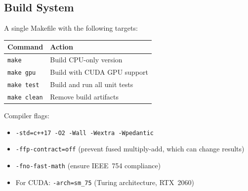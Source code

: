 \subsection{Build System}
\label{sec:build}

A single Makefile with the following targets:

\begin{center}
\begin{tabular}{@{}ll@{}}
\toprule
\textbf{Command} & \textbf{Action} \\
\midrule
\texttt{make}       & Build CPU-only version \\
\texttt{make gpu}   & Build with CUDA GPU support \\
\texttt{make test}  & Build and run all unit tests \\
\texttt{make clean} & Remove build artifacts \\
\bottomrule
\end{tabular}
\end{center}

Compiler flags:
\begin{itemize}
  \item \texttt{-std=c++17 -O2 -Wall -Wextra -Wpedantic}
  \item \texttt{-ffp-contract=off} (prevent fused multiply-add, which can change results)
  \item \texttt{-fno-fast-math} (ensure IEEE~754 compliance)
  \item For CUDA: \texttt{-arch=sm\_75} (Turing architecture, RTX~2060)
\end{itemize}
